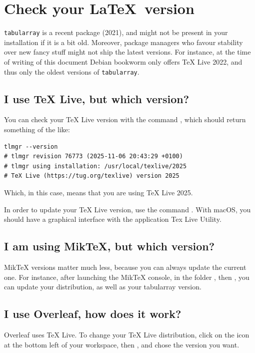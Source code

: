 \chapter{Check your \LaTeX\ version}\label{app:version}

\texttt{tabularray} is a recent package (2021), and might not be present in your installation if it is a bit old. Moreover, package managers who favour stability over new fancy stuff might not ship the latest versions. For instance, at the time of writing of this document Debian bookworm only offers TeX Live 2022, and thus only the oldest versions of \texttt{tabularray}.

\section{I use TeX Live, but which version?}
You can check your TeX Live version with the command , which should return something of the like:

\begin{verbatim}
tlmgr --version
# tlmgr revision 76773 (2025-11-06 20:43:29 +0100)
# tlmgr using installation: /usr/local/texlive/2025
# TeX Live (https://tug.org/texlive) version 2025
\end{verbatim}

Which, in this case, means that you are using TeX Live 2025.

In order to update your TeX Live version, use the command . With macOS, you should have a graphical interface with the application Tex Live Utility.

\section{I am using MikTeX, but which version?}

MikTeX versions matter much less, because you can always update the current one. For instance, after launching the MikTeX console, in the folder , then , you can update your distribution, as well as your tabularray version.

\section{I use Overleaf, how does it work?}

Overleaf uses TeX Live. To change your TeX Live distribution, click on the  icon at the bottom left of your workspace, then , and chose the version you want.

